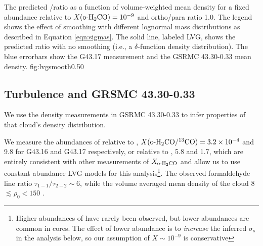{The predicted \formaldehyde \oneone/\twotwo ratio as a function of volume-weighted mean
density for a fixed abundance relative to \hh $X(\textrm{o-H}_2\textrm{CO}) = 10^{-9}$ and \hh
ortho/para ratio 1.0.  The legend shows the effect of smoothing with different
lognormal mass distributions as described in Equation \ref{eqn:sigmas}.  %
The solid line, labeled LVG, shows the predicted ratio
with no smoothing (i.e., a $\delta$-function density distribution).
The blue errorbars show the G43.17 \formaldehyde measurement and the GSRMC
43.30-0.33 mean density.
}
{fig:lvgsmooth}{0.5}{0}

\subsection{Turbulence and GRSMC 43.30-0.33}
We use the density measurements in GSRMC 43.30-0.33 to infer properties of that
cloud's density distribution.

We measure the abundances of \ortho relative to \thirteenco,
$X(\textrm{o-H}_2\textrm{CO}/^{13}\textrm{CO}) = 3.2\times10^{-4}$ and 9.8 for G43.16 and G43.17
respectively, or relative to \hh, 5.8 and 1.7, which are
entirely consistent with other measurements of $X_{\textrm{o-H}_2\textrm{CO}}$
\citep{Johnstone2003a} and allow us to use constant abundance LVG models for this
analysis\footnote{Higher abundances of \formaldehyde have rarely been observed,
but lower abundances are common in cores.  The effect of lower abundance is to
\emph{increase} the inferred $\sigma_s$ in the analysis below, so our
assumption of $X\sim10^{-9}$ is conservative}.  The observed
formaldehyde line ratio $\tau_{1-1}/\tau_{2-2} \sim 6$, while the volume
averaged mean density of the cloud 8 \percc $\lesssim \rho_0 <
150$ \percc.

